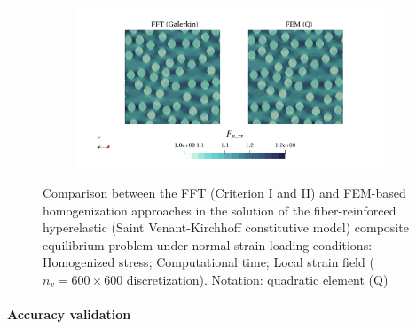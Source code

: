 \begin{figure}[hbt]
\begin{subfigure}[b]{0.49\textwidth}
    \caption{}
    \label{subfig:svk_2D_normal_cpu_time_vs_n_voxels}
  \end{subfigure}
  \begin{subfigure}[b]{\textwidth}
    \centering
    \includegraphics[width=\textwidth]{figures/svk_2D_normal_strain_11}
    \caption{}
    \label{subfig:svk_2D_normal_strain_11}
  \end{subfigure}
  \caption{Comparison between the FFT (Criterion I and II) and FEM-based homogenization approaches in the
  solution of the fiber-reinforced hyperelastic (Saint Venant-Kirchhoff constitutive model) composite equilibrium problem under normal strain loading conditions:
   Homogenized stress;
   Computational time;
   Local strain field (\(n_v = 600 \times 600\)
  discretization). Notation: quadratic element (Q)}
\label{fig:svk_2D_normal}
\end{figure}

\FloatBarrier

\paragraph{Accuracy validation}

